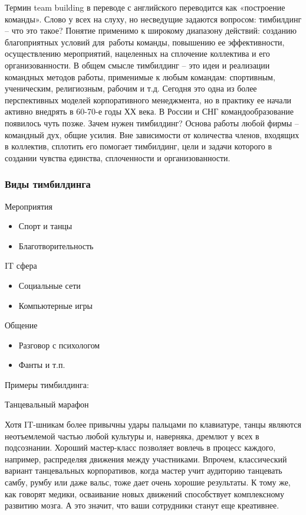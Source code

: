 \documentclass{../industrial-development}
\begin{document}
\lecturenotes

Термин team building в переводе с английского переводится как «построение команды». Слово у всех на слуху, но несведущие задаются вопросом: тимбилдинг – что это такое? Понятие применимо к широкому диапазону действий: созданию благоприятных условий для~работы команды, повышению ее эффективности, осуществлению мероприятий, нацеленных на сплочение коллектива и его организованности.
В общем смысле тимбилдинг – это идеи и реализации командных методов работы, применимые к любым командам: спортивным, ученическим, религиозным, рабочим и т.д. Сегодня это одна из более перспективных моделей корпоративного менеджмента, но в практику ее начали активно внедрять в 60-70-е годы ХХ века. В России и СНГ командообразование появилось чуть позже.
Зачем нужен тимбилдинг?
Основа работы любой фирмы – командный дух, общие усилия. Вне зависимости от количества членов, входящих в коллектив, сплотить его помогает тимбилдинг, цели и задачи которого в создании чувства единства, сплоченности и организованности.

\begin{frame} \frametitle{Виды тимбилдинга}
  \begin{block}{Мероприятия}
  \begin{itemize}
  \item Спорт и танцы
  \item Благотворительность
  \end{itemize}
  \end{block}
  \begin{block}{IT сфера}
  \begin{itemize}
  \item Социальные сети
  \item Компьютерные игры
  \end{itemize}
  \end{block}
  \begin{block}{Общение}
  \begin{itemize}
  \item Разговор с психологом
  \item Фанты и т.п.
  \end{itemize}
  \end{block}
\end{frame}

\lecturenotes

Примеры тимбилдинга:

Танцевальный марафон

Хотя IT-шникам более привычны удары пальцами по клавиатуре, танцы являются неотъемлемой частью любой культуры и, наверняка, дремлют у всех в подсознании. Хороший мастер-класс позволяет вовлечь в процесс каждого, например, распределяя движения между участниками. Впрочем, классический вариант танцевальных корпоративов, когда мастер учит аудиторию танцевать самбу, румбу или даже вальс, тоже дает очень хорошие результаты. К тому же, как говорят медики, осваивание новых движений способствует комплексному развитию мозга. А это значит, что ваши сотрудники станут еще креативнее.
\end{document}
